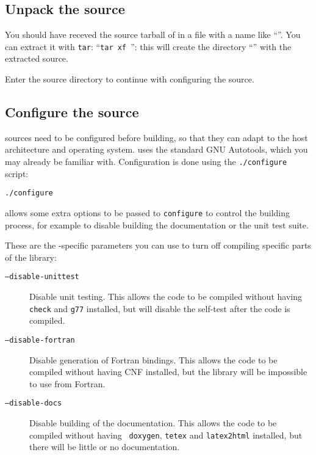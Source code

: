 \subsection{Unpack the source}

You should have receved the source tarball of \dballe{} in a file with a name
like ``\tarball{}''.  You can extract it with {\tt tar}: ``{\tt tar xf
\tarball{}}'': this will create the directory ``\sourcedir{}'' with the
extracted source.

Enter the source directory to continue with configuring the source.


\subsection{Configure the source}

\dballe{} sources need to be configured before building, so that they can adapt
to the host architecture and operating system.  \dballe{} uses the standard GNU
Autotools, which you may already be familiar with.  Configuration is done using
the {\tt ./configure} script:

\begin{verbatim}
./configure
\end{verbatim}

\dballe{} allows some extra options to be passed to {\tt configure} to control
the building process, for example to disable building the documentation or the
unit test suite.

These are the \dballe{}-specific parameters you can use to turn off compiling
specific parts of the library:

\begin{description}
\item[\tt --disable-unittest] Disable unit testing.  This allows the code to be
			   compiled without having {\tt check} and {\tt g77}
			   installed, but will disable the self-test after the
			   code is compiled.
\item[\tt --disable-fortran] Disable generation of Fortran bindings.  This allows
			   the code to be compiled without having CNF
			   installed, but the library will be impossible to use
			   from Fortran.
\item[\tt --disable-docs] Disable building of the documentation.  This allows
			   the code to be compiled without having {\tt
			   doxygen}, {\tt tetex} and {\tt latex2html}
			   installed, but there will be little or no
			   documentation.
\end{description}

